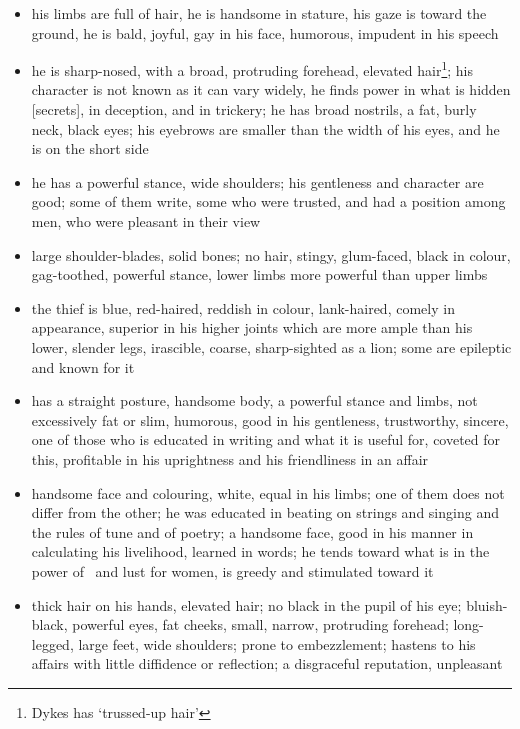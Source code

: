 \begin{itemize}[topsep=0em,itemsep=0em]
\item[\Aries] his limbs are full of hair, he is handsome in stature, his gaze is toward the ground, he is bald, joyful, gay in his face, humorous, impudent in his speech
\item[\Taurus] he is sharp-nosed, with a broad, protruding forehead,  elevated hair\footnote{Dykes has `trussed-up hair'}; his character is not known as it can vary widely, he finds power in what is hidden [secrets], in deception, and in trickery; he has broad nostrils, a fat, burly neck, black eyes; his eyebrows are smaller than the width of his eyes, and he is on the short side
\item[\Gemini] he has a powerful stance, wide shoulders; his gentleness and character are good; some of them write, some who were trusted, and had a position among men, who were pleasant in their view
\item[\Cancer] large shoulder-blades, solid bones; no hair, stingy, glum-faced, black in colour, gag-toothed, powerful stance, lower limbs more powerful than upper limbs
\item[\Leo] the thief is blue, red-haired, reddish in colour, lank-haired, comely in appearance, superior in his higher joints which are more ample than his lower, slender legs, irascible, coarse, sharp-sighted as a lion; some are epileptic and known for it
\item[\Virgo] has a straight posture, handsome body, a powerful stance and limbs, not excessively fat or slim, humorous, good in his gentleness, trustworthy, sincere, one of those who is educated in writing and what it is useful for, coveted for this, profitable in his uprightness and his friendliness in an affair
\item[\Libra] handsome face and colouring, white, equal in his limbs; one of them does not differ from the other; he was educated in beating on strings and singing and the rules of tune and of poetry; a handsome face, good in his manner in calculating his livelihood, learned in words; he tends toward what is in the power of \Venus\, and lust for women, is greedy and stimulated toward it
\item[\Scorpio] thick hair on his hands, elevated hair; no black in the pupil of his eye; bluish-black, powerful eyes, fat cheeks, small, narrow, protruding forehead; long-legged, large feet, wide shoulders; prone to embezzlement; hastens to his affairs with little diffidence or reflection; a disgraceful reputation, unpleasant

\end{itemize}
